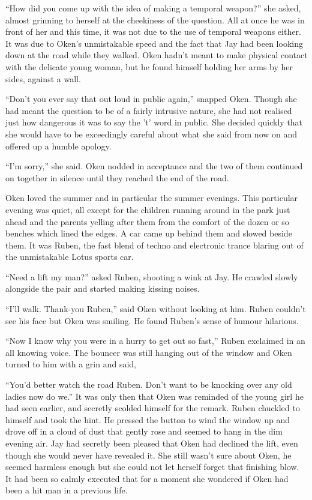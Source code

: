``How did you come up with the idea of making a temporal weapon?'' she asked, almost grinning to herself at the cheekiness of the question. All at once he was in front of her and this time, it was not due to the use of temporal weapons either. It was due to Oken's unmistakable speed and the fact that Jay had been looking down at the road while they walked. Oken hadn't meant to make physical contact with the delicate young woman, but he found himself holding her arms by her sides, against a wall.

``Don't you ever say that out loud in public again,'' snapped Oken. Though she had meant the question to be of a fairly intrusive nature, she had not realised just how dangerous it was to say the 't' word in public. She decided quickly that she would have to be exceedingly careful about what she said from now on and offered up a humble apology.

``I'm sorry,'' she said. Oken nodded in acceptance and the two of them continued on together in silence until they reached the end of the road.

Oken loved the summer and in particular the summer evenings. This particular evening was quiet, all except for the children running around in the park just ahead and the parents yelling after them from the comfort of the dozen or so benches which lined the edges. A car came up behind them and slowed beside them. It was Ruben, the fast blend of techno and electronic trance blaring out of the unmistakable Lotus sports car.

``Need a lift my man?'' asked Ruben, shooting a wink at Jay. He crawled slowly alongside the pair and started making kissing noises.

``I'll walk. Thank-you Ruben,'' said Oken without looking at him. Ruben couldn't see his face but Oken was smiling. He found Ruben's sense of humour hilarious.

``Now I know why you were in a hurry to get out so fast,'' Ruben exclaimed in an all knowing voice. The bouncer was still hanging out of the window and Oken turned to him with a grin and said,

``You'd better watch the road Ruben. Don't want to be knocking over any old ladies now do we.'' It was only then that Oken was reminded of the young girl he had seen earlier, and secretly scolded himself for the remark. Ruben chuckled to himself and took the hint. He pressed the button to wind the window up and drove off in a cloud of dust that gently rose and seemed to hang in the dim evening air. Jay had secretly been pleased that Oken had declined the lift, even though she would never have revealed it. She still wasn't sure about Oken, he seemed harmless enough but she could not let herself forget that finishing blow. It had been so calmly executed that for a moment she wondered if Oken had been a hit man in a previous life.

